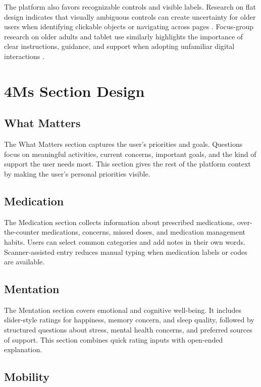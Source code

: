 \documentclass[11pt]{article}
\begin{document}
The platform also favors recognizable controls and visible labels. Research on flat design indicates that visually ambiguous controls can create uncertainty for older users when identifying clickable objects or navigating across pages \cite{urbano-flat-design}. Focus-group research on older adults and tablet use similarly highlights the importance of clear instructions, guidance, and support when adopting unfamiliar digital interactions \cite{vaportzis-tablet-barriers}.

\section{4Ms Section Design}

\subsection{What Matters}

The What Matters section captures the user's priorities and goals. Questions focus on meaningful activities, current concerns, important goals, and the kind of support the user needs most. This section gives the rest of the platform context by making the user's personal priorities visible.

\subsection{Medication}

The Medication section collects information about prescribed medications, over-the-counter medications, concerns, missed doses, and medication management habits. Users can select common categories and add notes in their own words. Scanner-assisted entry reduces manual typing when medication labels or codes are available.

\subsection{Mentation}

The Mentation section covers emotional and cognitive well-being. It includes slider-style ratings for happiness, memory concern, and sleep quality, followed by structured questions about stress, mental health concerns, and preferred sources of support. This section combines quick rating inputs with open-ended explanation.

\subsection{Mobility}
\end{document}
